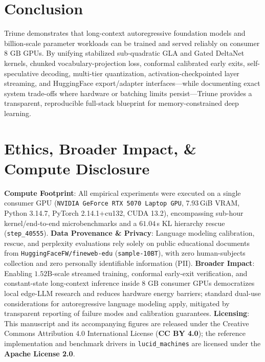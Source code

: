 \documentclass[10pt,twocolumn,letterpaper]{article}
\begin{document}
\section{Conclusion}

Triune demonstrates that long-context autoregressive foundation models and billion-scale parameter workloads can be trained and served reliably on consumer $8\text{ GB}$ GPUs. By unifying stabilized sub-quadratic GLA and Gated DeltaNet kernels, chunked vocabulary-projection loss, conformal calibrated early exits, self-speculative decoding, multi-tier quantization, activation-checkpointed layer streaming, and HuggingFace export/adapter interfaces---while documenting exact system trade-offs where hardware or batching limits persist---Triune provides a transparent, reproducible full-stack blueprint for memory-constrained deep learning.

\section*{Ethics, Broader Impact, \& Compute Disclosure}

\textbf{Compute Footprint}: All empirical experiments were executed on a single consumer GPU (\texttt{NVIDIA GeForce RTX 5070 Laptop GPU}, $7.93$\,GiB VRAM, Python 3.14.7, PyTorch 2.14.1+cu132, CUDA 13.2), encompassing sub-hour kernel/end-to-end microbenchmarks and a $61.04$\,s KL hierarchy rescue (\texttt{step\_40555}).
\textbf{Data Provenance \& Privacy}: Language modeling calibration, rescue, and perplexity evaluations rely solely on public educational documents from \texttt{HuggingFaceFW/fineweb-edu} (\texttt{sample-10BT}), with zero human-subjects collection and zero personally identifiable information (PII).
\textbf{Broader Impact}: Enabling $1.52\text{B}$-scale streamed training, conformal early-exit verification, and constant-state long-context inference inside $8\text{ GB}$ consumer GPUs democratizes local edge-LLM research and reduces hardware energy barriers; standard dual-use considerations for autoregressive language modeling apply, mitigated by transparent reporting of failure modes and calibration guarantees.
\textbf{Licensing}: This manuscript and its accompanying figures are released under the Creative Commons Attribution 4.0 International License (\textbf{CC BY 4.0}); the reference implementation and benchmark drivers in \texttt{lucid\_machines} are licensed under the \textbf{Apache License 2.0}.



\end{document}
